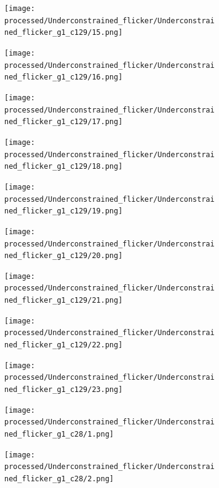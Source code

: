 \documentclass{article}
\begin{document}
\begin{figure}
	\begin{subfigure}{0.1\textwidth}
		\texttt{[image: processed/Underconstrained\_flicker/Underconstrained\_flicker\_g1\_c129/15.png]}
	\end{subfigure}
	\begin{subfigure}{0.1\textwidth}
		\texttt{[image: processed/Underconstrained\_flicker/Underconstrained\_flicker\_g1\_c129/16.png]}
	\end{subfigure}
	\begin{subfigure}{0.1\textwidth}
		\texttt{[image: processed/Underconstrained\_flicker/Underconstrained\_flicker\_g1\_c129/17.png]}
	\end{subfigure}
	\begin{subfigure}{0.1\textwidth}
		\texttt{[image: processed/Underconstrained\_flicker/Underconstrained\_flicker\_g1\_c129/18.png]}
	\end{subfigure}
	\begin{subfigure}{0.1\textwidth}
		\texttt{[image: processed/Underconstrained\_flicker/Underconstrained\_flicker\_g1\_c129/19.png]}
	\end{subfigure}
	\begin{subfigure}{0.1\textwidth}
		\texttt{[image: processed/Underconstrained\_flicker/Underconstrained\_flicker\_g1\_c129/20.png]}
	\end{subfigure}
	\begin{subfigure}{0.1\textwidth}
		\texttt{[image: processed/Underconstrained\_flicker/Underconstrained\_flicker\_g1\_c129/21.png]}
	\end{subfigure}
	\begin{subfigure}{0.1\textwidth}
		\texttt{[image: processed/Underconstrained\_flicker/Underconstrained\_flicker\_g1\_c129/22.png]}
	\end{subfigure}
	\begin{subfigure}{0.1\textwidth}
		\texttt{[image: processed/Underconstrained\_flicker/Underconstrained\_flicker\_g1\_c129/23.png]}
	\end{subfigure}
	\begin{subfigure}{0.1\textwidth}
		\texttt{[image: processed/Underconstrained\_flicker/Underconstrained\_flicker\_g1\_c28/1.png]}
	\end{subfigure}
	\begin{subfigure}{0.1\textwidth}
		\texttt{[image: processed/Underconstrained\_flicker/Underconstrained\_flicker\_g1\_c28/2.png]}
	\end{subfigure}
	\begin{subfigure}{0.1\textwidth}

\end{subfigure}
\end{figure}
\end{document}
